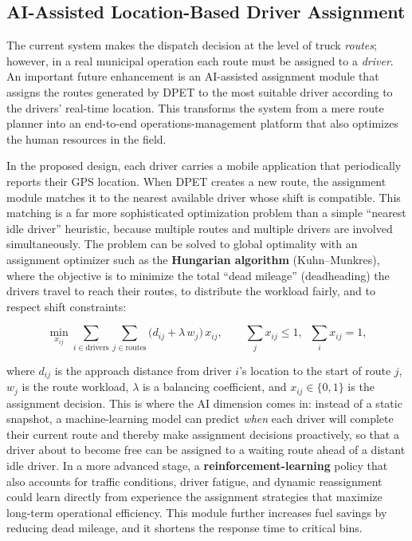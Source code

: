 \documentclass[12pt,a4paper]{report}
\begin{document}
\begin{itemize}[leftmargin=*]
\subsection{AI-Assisted Location-Based Driver Assignment}

\indent The current system makes the dispatch decision at the level of truck \textit{routes}; however, in a real municipal operation each route must be assigned to a \textit{driver}. An important future enhancement is an AI-assisted assignment module that assigns the routes generated by DPET to the most suitable driver according to the drivers' real-time location. This transforms the system from a mere route planner into an end-to-end operations-management platform that also optimizes the human resources in the field.

\indent In the proposed design, each driver carries a mobile application that periodically reports their GPS location. When DPET creates a new route, the assignment module matches it to the nearest available driver whose shift is compatible. This matching is a far more sophisticated optimization problem than a simple ``nearest idle driver'' heuristic, because multiple routes and multiple drivers are involved simultaneously. The problem can be solved to global optimality with an assignment optimizer such as the \textbf{Hungarian algorithm} (Kuhn--Munkres), where the objective is to minimize the total ``dead mileage'' (deadheading) the drivers travel to reach their routes, to distribute the workload fairly, and to respect shift constraints:

\begin{equation}
\min_{x_{ij}} \sum_{i \in \text{drivers}} \sum_{j \in \text{routes}} \bigl( d_{ij} + \lambda\,w_{j} \bigr)\, x_{ij},
\qquad \sum_{j} x_{ij} \leq 1,\;\; \sum_{i} x_{ij} = 1,
\label{eq:driver_assignment}
\end{equation}

\indent where $d_{ij}$ is the approach distance from driver $i$'s location to the start of route $j$, $w_{j}$ is the route workload, $\lambda$ is a balancing coefficient, and $x_{ij}\in\{0,1\}$ is the assignment decision. This is where the AI dimension comes in: instead of a static snapshot, a machine-learning model can predict \textit{when} each driver will complete their current route and thereby make assignment decisions proactively, so that a driver about to become free can be assigned to a waiting route ahead of a distant idle driver. In a more advanced stage, a \textbf{reinforcement-learning} policy that also accounts for traffic conditions, driver fatigue, and dynamic reassignment could learn directly from experience the assignment strategies that maximize long-term operational efficiency. This module further increases fuel savings by reducing dead mileage, and it shortens the response time to critical bins.










\end{itemize}
\end{document}
